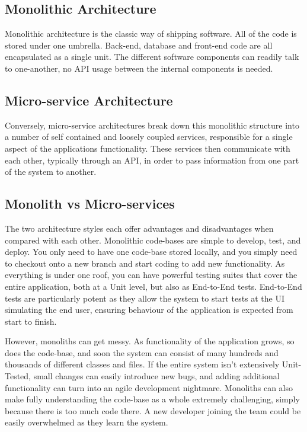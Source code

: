 \subsection{Monolithic Architecture}

Monolithic architecture is the classic way of shipping software. All of the code is stored under one umbrella. Back-end, database and front-end code are all encapsulated as a single unit. The different software components can readily talk to one-another, no API usage between the internal components is needed. 

\subsection{Micro-service Architecture}

Conversely, micro-service architectures break down this monolithic structure into a number of self contained and loosely coupled services, responsible for a single aspect of the applications functionality. These services then communicate with each other, typically through an API, in order to pass information from one part of the system to another.

\subsection{Monolith vs Micro-services}

The two architecture styles each offer advantages and disadvantages when compared with each other. 
Monolithic code-bases are simple to develop, test, and deploy. You only need to have one code-base stored locally, and you simply need to checkout onto a new branch and start coding to add new functionality. As everything is under one roof, you can have powerful testing suites that cover the entire application, both at a Unit level, but also as End-to-End tests. End-to-End tests are particularly potent as they allow the system to start tests at the UI simulating the end user, ensuring behaviour of the application is expected from start to finish.

However, monoliths can get messy. As functionality of the application grows, so does the code-base, and soon the system can consist of many hundreds and thousands of different classes and files. If the entire system isn't extensively Unit-Tested, small changes can easily introduce new bugs, and adding additional functionality can turn into an agile development nightmare. Monoliths can also make fully understanding the code-base as a whole extremely challenging, simply because there is too much code there. A new developer joining the team could be easily overwhelmed as they learn the system. 

